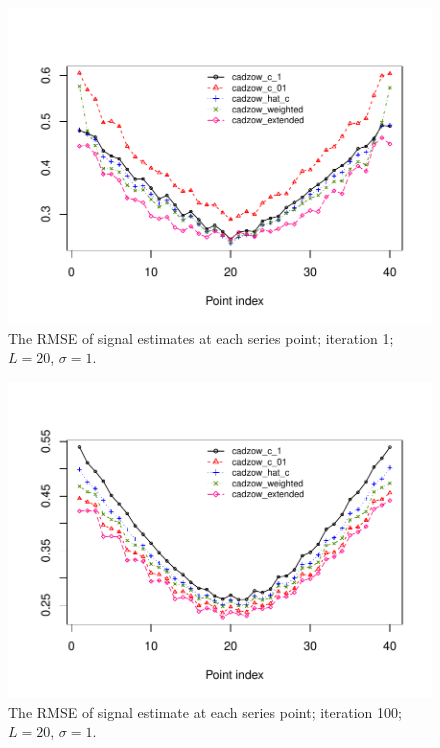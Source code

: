 \documentclass[sii]{ipart}
\begin{document}
\begin{figure}[!hhh]
		\includegraphics[width = \columnwidth]{s1_it1.pdf}
		\caption{The RMSE of signal estimates at each series point; iteration 1; $L=20$, $\sigma=1$.}
		\label{fig:s1_it1}
\end{figure}

\begin{figure}[!hhh]
		\includegraphics[width = \columnwidth]{s1_it100.pdf}
		\caption{The RMSE of signal estimate at each series point; iteration 100; $L=20$, $\sigma=1$.}
		\label{fig:s1_it100}
\end{figure}
\end{document}
